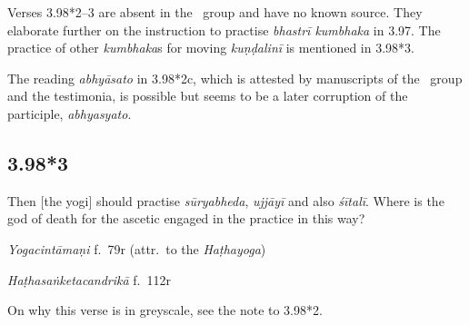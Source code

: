 \begin{ekdosis}
\begin{philcomm}[hp03_098_2]
Verses 3.98*2–3 are absent in the \textalpha\ group and have no known source. They elaborate further on the instruction to practise \emph{bhastrī kumbhaka} in 3.97. The practice of other \emph{kumbhaka}s for moving \emph{kuṇḍalinī} is mentioned in 3.98*3. 

The reading \emph{abhyāsato} in 3.98*2c, which is attested by manuscripts of the \textgamma\ group and the testimonia, is possible but seems to be a later corruption of the participle, \emph{abhyasyato}.
\end{philcomm}


\subsection*{3.98*3}
\begin{translation}[hp03_098_3]
Then [the yogi] should practise \emph{sūryabheda}, \emph{ujjāyī} and also \emph{śītalī}. Where is the god of death for the ascetic engaged in the practice in this way?
\end{translation}


\begin{testimonia}[hp03_098_3]
\emph{Yogacintāmaṇi} f.~79r (attr.~to the \emph{Haṭhayoga})
\begin{versinnote}
\end{versinnote}

\emph{Haṭhasaṅketacandrikā} f.~112r
\begin{versinnote}
\end{versinnote}
\end{testimonia}

\begin{philcomm}[hp03_098_3]
On why this verse is in greyscale, see the note to 3.98*2.

\end{philcomm}


\end{ekdosis}
